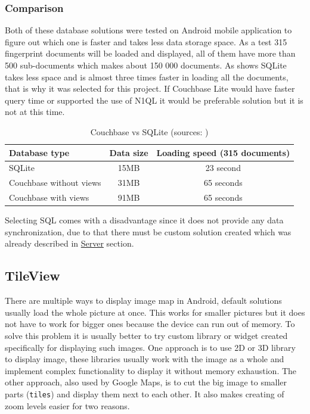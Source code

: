 \subsubsection{Comparison}\label{subsubsec:Comparison}
Both of these database solutions were tested on Android mobile application to figure out which one is faster and takes less data storage space. As a test 315 fingerprint documents will be loaded and displayed, all of them have more than 500 sub-documents which makes about 150 000 documents. As  shows SQLite takes less space and is almost three times faster in loading all the documents, that is why it was selected for this project. If Couchbase Lite would have faster query time or supported the use of N1QL it would be preferable solution but it is not at this time.

\begin{table}[h]
	\begin{center}
		\begin{tabular}{| l | c | c |}
			\hline
			Database type & Data size & Loading speed (315 documents) \\ \hline
			SQLite & 15MB & 23 second \\ \hline
			Couchbase without views & 31MB & 65 seconds \\ \hline
			Couchbase with views & 91MB & 65 seconds \\ \hline
		\end{tabular}
		\caption{Couchbase vs SQLite (sources: \cite{LGWSP, LGWST, HW2, PM600, AZW3})}
		\label{tab3}
	\end{center}
\end{table}

Selecting SQL comes with a disadvantage since it does not provide any data synchronization, due to that there must be custom solution created which was already described in \hyperref[sec:Server]{Server} section.

\subsection{TileView}\label{subsec:TileView}
There are multiple ways to display image map in Android, default solutions usually load the whole picture at once. This works for smaller pictures but it does not have to work for bigger ones because the device can run out of memory. To solve this problem it is usually better to try custom library or widget created specifically for displaying such images. One approach is to use 2D or 3D library to display image, these libraries usually work with the image as a whole and implement complex functionality to display it without memory exhaustion. The other approach, also used by Google Maps, is to cut the big image to smaller parts (\verb|tiles|) and display them next to each other. It also makes creating of zoom levels easier for two reasons.

